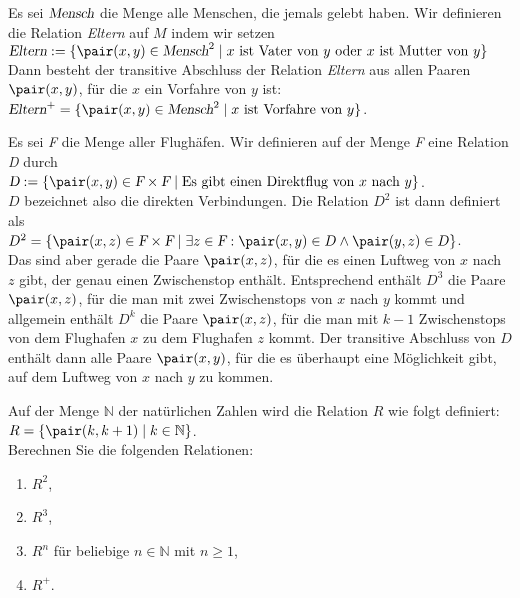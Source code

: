 \example
Es sei $\textsl{Mensch}$ die Menge alle Menschen, die jemals gelebt haben.  Wir definieren
die Relation \textsl{Eltern} auf $M$ indem wir setzen
\\[0.2cm]
\hspace*{1.3cm}
$\textsl{Eltern} := \{ \pair(x,y) \in \textsl{Mensch}^2 \mid \mbox{$x$ ist Vater von $y$ oder 
                                                                   $x$ ist Mutter von $y$} \}$
\\[0.2cm]
Dann besteht der transitive Abschluss der Relation \textsl{Eltern} aus allen Paaren
$\pair(x,y)$, für die $x$ ein Vorfahre von $y$ ist:
\\[0.2cm]
\hspace*{1.3cm}
$\textsl{Eltern}^+ = \{ \pair(x,y) \in \textsl{Mensch}^2 \mid \mbox{$x$ ist Vorfahre von $y$} \}$.
\next

\example
Es sei \textsl{F} die Menge aller Flughäfen.  Wir definieren auf der Menge \textsl{F} eine
Relation \textsl{D} durch
\\[0.2cm]
\hspace*{1.3cm}
$\textsl{D} := \{ \pair(x,y) \in \textsl{F} \times \textsl{F} \mid
                  \mbox{Es gibt einen Direktflug von $x$ nach $y$} \}$.
\\[0.2cm]
$D$ bezeichnet also die direkten Verbindungen.  Die Relation $D^2$ ist dann definiert als
\\[0.2cm]
\hspace*{1.3cm}
$D^2 = \{ \pair(x,z) \in \textsl{F} \times \textsl{F} \mid 
          \exists z \in \textsl{F}: \pair(x,y) \in D \wedge \pair(y,z) \in D \}$.
\\[0.2cm]
Das sind aber gerade die Paare $\pair(x,z)$, für die es einen Luftweg von $x$ nach $z$
gibt, der genau einen Zwischenstop enthält.  Entsprechend enthält $D^3$ die Paare
$\pair(x,z)$, für die man mit zwei Zwischenstops von $x$ nach $y$ kommt und allgemein
enthält $D^k$ die Paare $\pair(x,z)$, für die man mit $k-1$ Zwischenstops von dem
Flughafen $x$ zu dem Flughafen $z$ kommt.
Der transitive Abschluss von $D$ enthält
dann alle Paare $\pair(x,y)$, für die es überhaupt eine Möglichkeit gibt, auf dem Luftweg
von $x$ nach $y$ zu kommen.

\exercise
Auf der Menge $\mathbb{N}$ der natürlichen Zahlen wird die Relation $R$ wie folgt definiert:
\\[0.2cm]
\hspace*{1.3cm}
$R = \{ \pair(k, k + 1) \mid k \in \mathbb{N} \}$.
\\[0.2cm]
Berechnen Sie die folgenden Relationen:
\begin{enumerate}
\item $R^2$,
\item $R^3$,
\item $R^n$ für beliebige $n \in \mathbb{N}$ mit $n \geq 1$,
\item $R^+$.
\end{enumerate}


